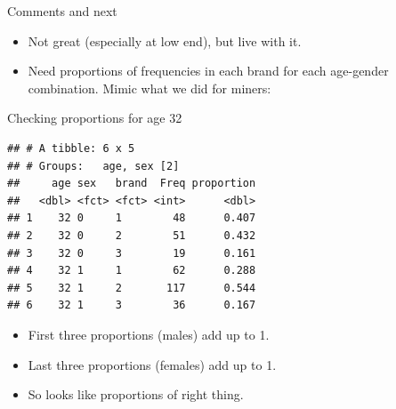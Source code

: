 \documentclass[ignorenonframetext,]{beamer}
\newenvironment{Shaded}{\begin{snugshade}}{\end{snugshade}}
\newcommand{\DataTypeTok}[1]{\textcolor[rgb]{0.13,0.29,0.53}{#1}}
\newcommand{\DecValTok}[1]{\textcolor[rgb]{0.00,0.00,0.81}{#1}}
\newcommand{\KeywordTok}[1]{\textcolor[rgb]{0.13,0.29,0.53}{\textbf{#1}}}
\newcommand{\NormalTok}[1]{#1}
\newcommand{\OperatorTok}[1]{\textcolor[rgb]{0.81,0.36,0.00}{\textbf{#1}}}
\newcommand{\StringTok}[1]{\textcolor[rgb]{0.31,0.60,0.02}{#1}}
\begin{document}
\begin{frame}[fragile]{Comments and next}
\protect\hypertarget{comments-and-next}{}

\begin{itemize}
\item
  Not great (especially at low end), but live with it.
\item
  Need proportions of frequencies in each brand for each age-gender
  combination. Mimic what we did for miners:
\end{itemize}

\begin{Shaded}
\end{Shaded}

\end{frame}

\begin{frame}[fragile]{Checking proportions for age 32}
\protect\hypertarget{checking-proportions-for-age-32}{}

\begin{Shaded}
\end{Shaded}

\begin{verbatim}
## # A tibble: 6 x 5
## # Groups:   age, sex [2]
##     age sex   brand  Freq proportion
##   <dbl> <fct> <fct> <int>      <dbl>
## 1    32 0     1        48      0.407
## 2    32 0     2        51      0.432
## 3    32 0     3        19      0.161
## 4    32 1     1        62      0.288
## 5    32 1     2       117      0.544
## 6    32 1     3        36      0.167
\end{verbatim}

\begin{itemize}
\item
  First three proportions (males) add up to 1.
\item
  Last three proportions (females) add up to 1.
\item
  So looks like proportions of right thing.
\end{itemize}

\end{frame}
\end{document}
